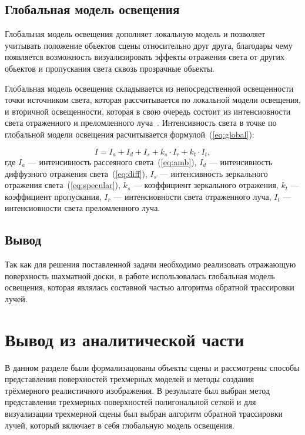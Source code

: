\subsection{Глобальная модель освещения}
Глобальная модель освещения дополняет локальную модель и позволяет учитывать положение обьектов сцены относительно друг друга, благодары чему появляется возможность визуализировать эффекты отражения света от других обьектов и пропускания света сквозь прозрачные обьекты.

Глобальная модель освещения складывается из непосредственной освещенности точки источником света, которая рассчитывается по локальной модели освещения, и вторичной освещенности, которая в свою очередь состоит из интенсиовности света отраженного и преломленного луча~\cite{shikin2001}. Интенсивность света в точке по глобальной модели освещения расчитывается формулой~(\ref{eq:global}):

\begin{equation}\label{global}
	I = I_{a} + I_{d} + I_{s} + k_{s} \cdot I_{r} + k_{t} \cdot I_{t},
\end{equation}
\noindent где 
	$I_{a}$ --- интенсивность рассеяного света~(\ref{eq:amb}), 
	$I_{d}$ --- интенсивность диффузного отражения света~(\ref{eq:diff}), 
	$I_{s}$ --- интенсивность зеркального отражения света~(\ref{eq:specular}),
	$k_{s}$ --- коэффициент зеркального отражения,
	$k_{t}$ --- коэффициент пропускания,
	$I_{r}$ --- интенсиовности света отраженного луча,
	$I_{t}$ --- интенсиовности света преломленного луча.


\subsection*{Вывод}
Так как для решения поставленной задачи необходимо реализовать отражающую поверхность шахматной доски, в работе использовалась глобальная модель освещения, которая являлась составной частью алгоритма обратной трассировки лучей.





\section*{Вывод из аналитической части}
В данном разделе были формализацованы объекты сцены и рассмотрены способы представления поверхностей трехмерных моделей и методы создания трёхмерного реалистичного изображения. В результате был выбран метод представления трехмерных поверхностей полигональной сеткой и для визуализации трехмерной сцены был выбран алгоритм обратной трассировки лучей, который включает в себя глобальную модель освещения.

\clearpage
